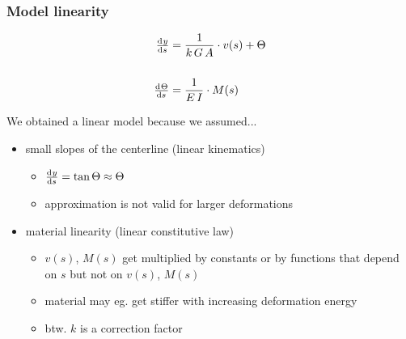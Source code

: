 \begin{frame}
  \frametitle{Model linearity}
  
  \begin{displaymath}
    \begin{alignedat}{1}
      \od{y}{s} &= \frac{1}{k \, G \, A} \cdot v(s) + \Theta  \\ \\
      \od{\Theta}{s} &= \frac{1}{E \, I} \cdot M(s)
    \end{alignedat}
  \end{displaymath}

  \vspace{1em}
  We obtained a linear model because we assumed...
  \begin{itemize}
    \item small slopes of the centerline (linear kinematics)
      \begin{itemize}
        \item $\od{y}{s} = \tan{\Theta} \approx \Theta$
        \item approximation is not valid for larger deformations
      \end{itemize} 
    \item material linearity (linear constitutive law)
      \begin{itemize}
        \item $v(s)$, $M(s)$ get multiplied by constants \newline
          or by functions that depend on $s$ but not on $v(s)$, $M(s)$
        \item material may eg. get stiffer with increasing deformation energy
        \item btw. $k$ is a correction factor %
      \end{itemize}
  \end{itemize}
\end{frame}

